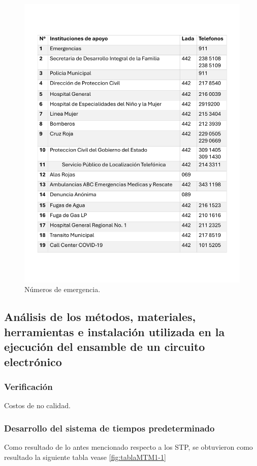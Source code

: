     \begin{figure}[H]
        \centering
        \includegraphics[scale=0.35]{15/img/tablaDirectorioEmergencias.pdf}
        \caption{Números de emergencia.}
        \label{fig:tablaDirectorioEmergencias}
    \end{figure}
    \subsection{Análisis de los métodos, materiales, herramientas e instalación utilizada en la ejecución del ensamble de un circuito electrónico}
    
    \subsubsection{Verificación}
    
    Costos de no calidad.
    \subsubsection{Desarrollo del sistema de tiempos predeterminado}
    Como resultado de lo antes mencionado respecto a los STP, se obtuvieron como resultado la siguiente tabla vease \ref{fig:tablaMTM1-1}
    

